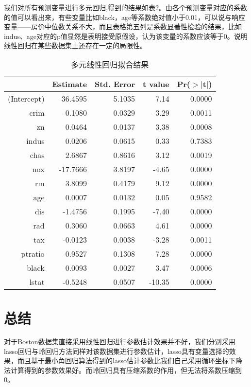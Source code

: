 \documentclass[cn]{elegantpaper}
\begin{document}
我们对所有预测变量进行多元回归,得到的结果如表2。由各个预测变量对应的系数的值可以看出来，有些变量比如black，age等系数绝对值小于0.01，可以说与响应变量——房价中位数关系不大，而且表格第五列是系数显著性检验的结果，比如indus、age对应的p值显然是表明接受原假设，认为该变量的系数应该等于0。说明线性回归在某些数据集上还存在一定的局限性。
\begin{table}[H]
    \centering
    \caption{多元线性回归拟合结果}
    \begin{tabular}{rrrrr}
      \hline
     & Estimate & Std. Error & t value & Pr($>$$|$t$|$) \\ 
      \hline
    (Intercept) & 36.4595 & 5.1035 & 7.14 & 0.0000 \\ 
      crim & -0.1080 & 0.0329 & -3.29 & 0.0011 \\ 
      zn & 0.0464 & 0.0137 & 3.38 & 0.0008 \\ 
      indus & 0.0206 & 0.0615 & 0.33 & 0.7383 \\ 
      chas & 2.6867 & 0.8616 & 3.12 & 0.0019 \\ 
      nox & -17.7666 & 3.8197 & -4.65 & 0.0000 \\ 
      rm & 3.8099 & 0.4179 & 9.12 & 0.0000 \\ 
      age & 0.0007 & 0.0132 & 0.05 & 0.9582 \\ 
      dis & -1.4756 & 0.1995 & -7.40 & 0.0000 \\ 
      rad & 0.3060 & 0.0663 & 4.61 & 0.0000 \\ 
      tax & -0.0123 & 0.0038 & -3.28 & 0.0011 \\ 
      ptratio & -0.9527 & 0.1308 & -7.28 & 0.0000 \\ 
      black & 0.0093 & 0.0027 & 3.47 & 0.0006 \\ 
      lstat & -0.5248 & 0.0507 & -10.35 & 0.0000 \\ 
       \hline
    \end{tabular}
\end{table}




\section{总结}
对于Boston数据集直接采用线性回归进行参数估计效果并不好，我们分别采用lasso回归与岭回归方法同样对该数据集进行参数估计，lasso具有变量选择的效果，而且基于最小角回归算法得到的lasso估计参数比我们自己采用循环坐标下降法计算得到的参数效果好。而岭回归具有压缩系数的作用，但无法将系数压缩到0。
\end{document}
